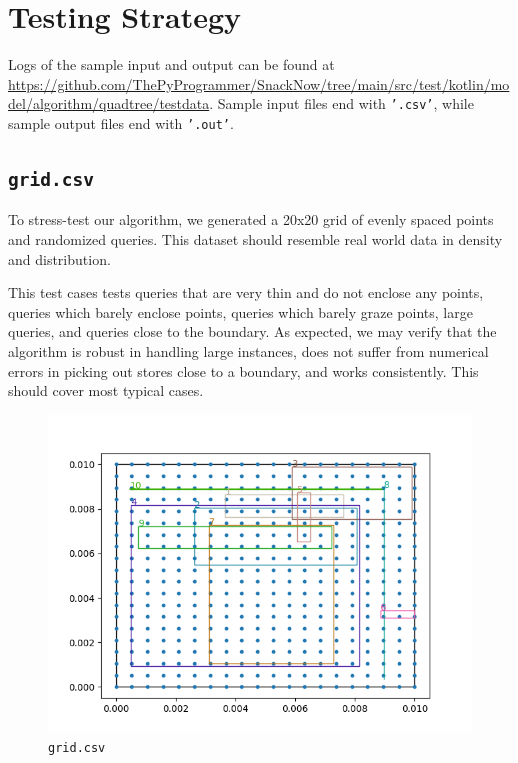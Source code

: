 \documentclass[12pt]{article}
\begin{document}
{\section{Testing Strategy}

Logs of the sample input and output can be found at \url{https://github.com/ThePyProgrammer/SnackNow/tree/main/src/test/kotlin/model/algorithm/quadtree/testdata}. Sample input files end with \texttt{'.csv'}, while sample output files end with \texttt{'.out'}.


\subsection{\texttt{grid.csv}}

To stress-test our algorithm, we generated a 20x20 grid of evenly spaced points and randomized queries. This dataset should resemble real world data in density and distribution.

This test cases tests queries that are very thin and do not enclose any points, queries which barely enclose points, queries which barely graze points, large queries, and queries close to the boundary. As expected, we may verify that the algorithm is robust in handling large instances, does not suffer from numerical errors in picking out stores close to a boundary, and works consistently. This should cover most typical cases.

\begin{figure}
    \centering
    \includegraphics[scale=0.8]{../img/grid.png}
    \caption{\texttt{grid.csv}}
    \label{fig:my_label}
\end{figure}


}
\end{document}
